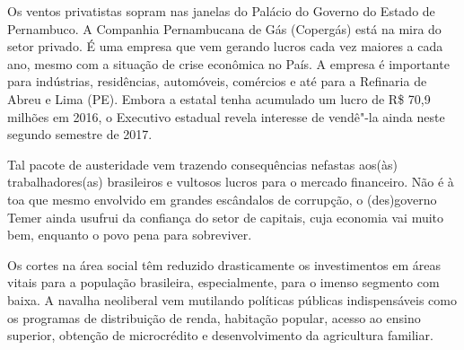 Os ventos privatistas sopram nas janelas do Palácio do Governo do Estado
de Pernambuco. A Companhia Pernambucana de Gás (Copergás) está na mira
do setor privado. É uma empresa que vem gerando lucros cada vez maiores
a cada ano, mesmo com a situação de crise econômica no País. A empresa é
importante para indústrias, residências, automóveis, comércios e até
para a Refinaria de Abreu e Lima (PE). Embora a estatal tenha acumulado
um lucro de R\$ 70,9 milhões em 2016, o Executivo estadual revela
interesse de vendê"-la ainda neste segundo semestre de 2017.

Tal pacote de austeridade vem trazendo consequências nefastas aos(às)
trabalhadores(as) brasileiros e vultosos lucros para o mercado
financeiro. Não é à toa que mesmo envolvido em grandes escândalos de
corrupção, o (des)governo Temer ainda usufrui da confiança do setor de
capitais, cuja economia vai muito bem, enquanto o povo pena para
sobreviver.

Os cortes na área social têm reduzido drasticamente os investimentos em
áreas vitais para a população brasileira, especialmente, para o imenso
segmento com baixa. A navalha neoliberal vem mutilando políticas
públicas indispensáveis como os programas de distribuição de renda,
habitação popular, acesso ao ensino superior, obtenção de microcrédito e
desenvolvimento da agricultura familiar.

